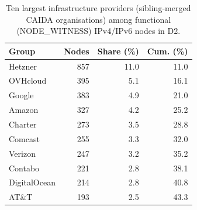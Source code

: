 \begin{table}[t]
\centering\small
\caption{Ten largest infrastructure providers (sibling-merged CAIDA organisations) among functional (NODE\_WITNESS) IPv4/IPv6 nodes in D2.}
\label{tab:topprov}

\begin{tabular}{lrrr}
\toprule
Group & Nodes & Share (\%) & Cum. (\%) \\
\midrule
Hetzner & 857 & 11.0 & 11.0 \\
OVHcloud & 395 & 5.1 & 16.1 \\
Google & 383 & 4.9 & 21.0 \\
Amazon & 327 & 4.2 & 25.2 \\
Charter & 273 & 3.5 & 28.8 \\
Comcast & 255 & 3.3 & 32.0 \\
Verizon & 247 & 3.2 & 35.2 \\
Contabo & 221 & 2.8 & 38.1 \\
DigitalOcean & 214 & 2.8 & 40.8 \\
AT\&T & 193 & 2.5 & 43.3 \\
\bottomrule
\end{tabular}
\end{table}
